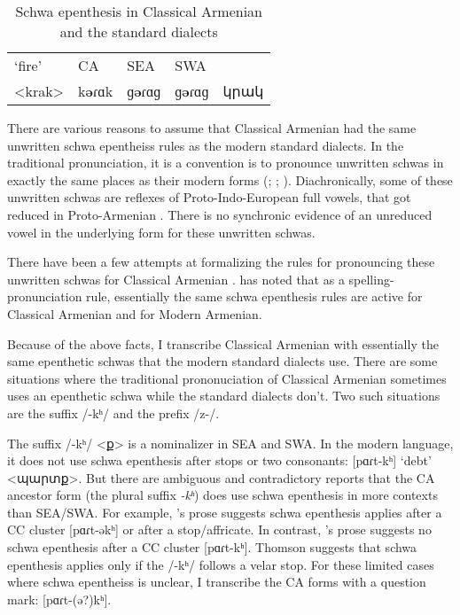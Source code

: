 \begin{table}[H]
	\caption{Schwa epenthesis in Classical Armenian and the standard dialects} \label{tab:HossepIntro:schwaEpen}
	\centering 
	\begin{tabular}{|l| lll| l| }
		\hline `fire'	& CA & SEA & SWA & \\
		<krak> & k\textbf{ə}ɾɑk &ɡ\textbf{ə}ɾɑɡ &ɡ\textbf{ə}ɾɑɡ & կրակ
		\\\hline 
	\end{tabular}
\end{table}

There are various reasons to assume that Classical Armenian had the same unwritten schwa epentheiss rules as the modern standard dialects. In the traditional pronunciation, it is a convention is to pronounce unwritten schwas in exactly the same places as their modern forms (\citealt[16]{Godel-1975-IntroClassicalArmenian}; \citealt[116]{Thomson-1989-IntroClassicalArmenian}; \citealt[1043]{Macak-2017-PhonoClassicalArmenian}). Diachronically, some of these unwritten schwas are reflexes of Proto-Indo-European full vowels, that got reduced in Proto-Armenian \citep[26]{Vaux-1998-ArmenianPhono}. There is no synchronic evidence of an unreduced vowel in the underlying form for these unwritten schwas.

There have been a few attempts at formalizing the rules for pronouncing these unwritten schwas for Classical Armenian \citep{Hammalian-1984-PhonoOldArmenian,Schwink-1994-ArmenianSchwaLexicalized,Pierce-2007-SchwaClassicalArmenian}. \citet{Pierce-2007-SchwaClassicalArmenian} has noted that as a spelling-pronunciation rule, essentially the same schwa epenthesis rules are active for Classical Armenian and for Modern Armenian.

Because of the above facts, I transcribe Classical Armenian with essentially the same epenthetic schwas that the modern standard dialects use. There are some situations where the traditional prononuciation of Classical Armenian sometimes uses an epenthetic schwa while the standard dialects don't. Two such situations are the suffix /-kʰ/ and the prefix /z-/. 

The suffix /-kʰ/ <ք> is a nominalizer in SEA and SWA. In the modern language, it does not use schwa epenthesis after stops or two consonants: [pɑɾt-kʰ] `debt' <պարտք>. But there are ambiguous and contradictory reports that the CA ancestor form (the plural suffix \textit{-kʰ}) does use schwa epenthesis in more contexts than SEA/SWA. For example, \citealt[18-19]{Godel-1975-IntroClassicalArmenian}'s prose suggests schwa epenthesis applies after a CC cluster [pɑɾt-əkʰ] or after a stop/affricate. In contrast, \citealt[120]{Thomson-1989-IntroClassicalArmenian}'s prose suggests no schwa epenthesis after a CC cluster [pɑɾt-kʰ]. Thomson suggests that schwa epenthesis applies only if the /-kʰ/ follows a velar stop. For these limited cases where schwa epentheiss is unclear, I transcribe the CA forms with a question mark: [pɑɾt-(ə?)kʰ]. 

